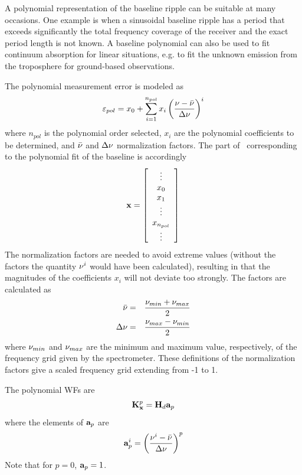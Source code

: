  A polynomial representation of the baseline ripple can be suitable
 at many occasions. One example is when a sinusoidal baseline ripple 
 has a period that exceeds significantly the total frequency coverage
 of the receiver and the exact period length is not known. A baseline
 polynomial can also be used to fit continuum absorption for linear
 situations, e.g. to fit the unknown emission from the troposphere
 for ground-based observations.

 The polynomial measurement error is modeled as
 \begin{equation}
   \varepsilon_{pol} = x_0 + \sum_{i=1}^{n_{pol}} x_i \left( 
                      \frac{\nu-\bar{\nu}}{\Delta \nu} \right)^i
 \end{equation}
 where $n_{pol}$ is the polynomial order selected, $x_i$ are the 
 polynomial coefficients to be determined, and $\bar{\nu}$ and
 $\Delta \nu$ normalization factors. The part of \xt\ corresponding
 to the polynomial fit of the baseline is accordingly
 \begin{equation}
   \mathbf{x} = \left[ \begin{array}{c} \vdots \\ x_0\\ x_1 \\ \vdots \\ x_{n_{pol}} \\ \vdots \end{array} \right]
 \end{equation}
 The normalization factors are needed to avoid extreme values (without
 the factors the quantity $\nu^i$ would have been calculated),
 resulting in that the magnitudes of the coefficients $x_i$ will not
 deviate too strongly. The factors are calculated as
 \begin{eqnarray}
   \bar{\nu} &=& \frac{\nu_{min}+\nu_{max}}{2} \\
   \label{eq:measerr:fmean}
   \Delta \nu &=& \frac{\nu_{max}-\nu_{min}}{2}
 \end{eqnarray}
 where $\nu_{min}$ and $\nu_{max}$ are the minimum and maximum value,
 respectively, of the frequency grid given by the spectrometer. These
 definitions of the normalization factors give a scaled frequency grid
 extending from -1 to 1.

 The polynomial WFs are
 \begin{equation}
   \mathbf{K}_{\mathbf{x}}^p = \mathbf{H}_d \mathbf{a}_p
 \end{equation}
 where the elements of $\mathbf{a}_p$ are
 \begin{equation}
   \mathbf{a}_p^i = \left( \frac{\nu^i-\bar{\nu}}{\Delta \nu} \right)^p
  \label{eq:measerr:kpol}
 \end{equation}
 Note that for $p=0$, $\mathbf{a}_p=1$. 
 
